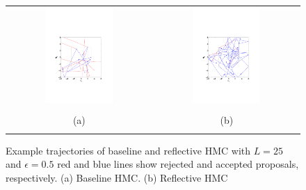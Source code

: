 \documentclass{article} %
\begin{document}
\begin{figure}
\setlength{\tabcolsep}{0em}
\vspace{-1mm}
\begin{center}
\begin{tabular}{cc}
\includegraphics[trim={3.2cm 6cm 3.2cm 9cm},clip,width=0.49\textwidth]{../plots3/BaselineHMC_l10_eps0_5_log_scatter2D.pdf} 
&\includegraphics[trim={3.2cm 6cm 3cm 9cm},clip,width=0.49\textwidth]{../plots3/ReflectiveHMC_l10_eps0_5_log_scatter2D.pdf}  \\
\vspace{-3.5mm}
\\
   \footnotesize(a) 
& \footnotesize(b) 
\\
\multicolumn{2}{c}{}
\end{tabular}
\end{center}
\vspace{-8mm}
\caption{\footnotesize
Example trajectories of baseline and reflective HMC with $L=25$ and $\epsilon=0.5$ red and blue lines show rejected and accepted proposals, respectively. (a) Baseline HMC. (b) Reflective HMC}
\vspace{-10pt}
\end{figure}
\end{document}
